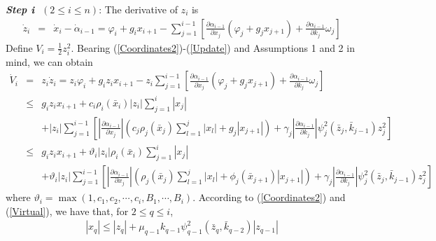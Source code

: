\documentclass{tSYS2e}
\theoremstyle{plain}
\theoremstyle{definition}
\begin{document}
\textbf{\emph{Step }$\textbf{\emph{i}}$\textbf{\ }$(2\leq i\leq n)$}: The derivative of $
z_{i}$ is
\begin{eqnarray}
\dot{z}_{i} &=&\dot{x}_{i}-\dot{\alpha}_{i-1}
=\varphi _{i}+g_{i}x_{i+1}
-\sum_{j=1}^{i-1}\left[ \frac{\partial
\alpha _{i-1}}{\partial x_{j}}\left( \varphi _{j}+g_{j}x_{j+1}\right) +\frac{
\partial \alpha _{i-1}}{\partial k_{j}}\omega _{j}\right]  \label{zidot}
\end{eqnarray}
Define $V_{i}=\frac{1}{2}z_{i}^{2}$. Bearing (\ref{Coordinates2})-(\ref{Update}) and Assumptions 1 and 2 in mind, we can obtain
\begin{eqnarray}
\dot{V}_{i} &=&z_{i}\dot{z}_{i}
=z_{i}\varphi _{i}+g_{i}z_{i}x_{i+1}
-z_{i}\sum_{j=1}^{i-1}\left[ \frac{\partial \alpha _{i-1}}{
\partial x_{j}}\left( \varphi _{j}+g_{j}x_{j+1}\right) +\frac{\partial
\alpha _{i-1}}{\partial k_{j}}\omega _{j}\right]   \nonumber \\
&\leq &g_{i}z_{i}x_{i+1}+c_{i}\rho _{i}(\bar{x}_{i})\left\vert
z_{i}\right\vert \sum_{j=1}^{i}\left\vert x_{j}\right\vert\nonumber\\
&&+\left\vert z_{i}\right\vert
\sum_{j=1}^{i-1}\left[ \left\vert
\frac{\partial \alpha _{i-1}}{\partial x_{j}}\right\vert \left( c_{j}\rho
_{j}(\bar{x}_{j})\sum_{l=1}^{j}\left\vert x_{l}\right\vert
+g_{j}\left\vert x_{j+1}\right\vert \right)+\gamma _{j}\left\vert \frac{\partial \alpha _{i-1}}{\partial k_{j}}
\right\vert \psi _{j}^{2}(\bar{z}_{j},\bar{k}_{j-1})z_{j}^{2}\right]   \nonumber\\
&\leq &g_{i}z_{i}x_{i+1}+\vartheta _{i}\left\vert z_{i}\right\vert \rho _{i}(
\bar{x}_{i})\sum_{j=1}^{i}\left\vert x_{j}\right\vert \nonumber \\
&&+\vartheta _{i}\left\vert z_{i}\right\vert
\sum_{j=1}^{i-1}\left[
\left\vert \frac{\partial \alpha _{i-1}}{\partial x_{j}}\right\vert \left(
\rho _{j}(\bar{x}_{j})\sum_{l=1}^{j}\left\vert
x_{l}\right\vert +\phi _{j}(\bar{x}_{j+1})\left\vert x_{j+1}\right\vert
\right)+\gamma _{j}\left\vert \frac{\partial \alpha _{i-1}}{\partial k_{j}}
\right\vert \psi _{j}^{2}(\bar{z}_{j},\bar{k}_{j-1})z_{j}^{2}\right]   \label{Vidot0}
\end{eqnarray}where $\vartheta _{i}=\max (1,c_{1},c_{2},\cdots ,c_{i},B_{1},\cdots ,B_{i})$.
According to (\ref{Coordinates2}) and (\ref{Virtual}), we have that, for $2\leq q\leq i$,
\begin{eqnarray}
\left\vert x_{q}\right\vert \leq \left\vert z_{q}\right\vert +\mu _{q-1}k_{q-1}\psi _{q-1}^{2}(\bar{z}
_{q},\bar{k}_{q-2})\left\vert z_{q-1}\right\vert  \label{xq}
\end{eqnarray}
\end{document}
